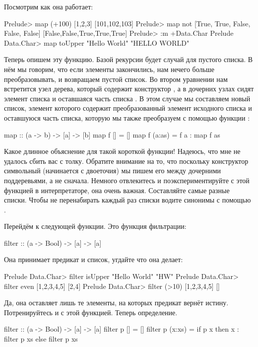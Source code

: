 Посмотрим как она работает:

\begin{code}
Prelude> map (+100) [1,2,3]
[101,102,103]
Prelude> map not [True, True, False, False, False]
[False,False,True,True,True]
Prelude> :m +Data.Char
Prelude Data.Char> map toUpper "Hello World"
"HELLO WORLD"
\end{code}

Теперь опишем эту функцию.
Базой рекурсии будет случай для пустого списка.
В нём мы говорим, что если элементы закончились, нам нечего
больше преобразовывать, и возвращаем пустой список. 
Во втором уравнении нам встретится узел дерева,
который содержит конструктор \In{:}, а в дочерних узлах
сидят элемент списка  и оставшаяся часть списка . 
 В этом случае 
мы составляем новый список, элемент которого содержит
преобразованный элемент  исходного списка
и оставшуюся часть списка, которую мы также
преобразуем с помощью функции :

\begin{code}
map :: (a -> b) -> [a] -> [b]
map f []     = []
map f (a:as) = f a : map f as
\end{code}

Какое длинное объяснение для такой короткой функции! Надеюсь, что
мне не удалось сбить вас с толку. Обратите внимание на то, 
что поскольку конструктор символьный (начинается с двоеточия) 
мы пишем его между дочерними поддеревьями, а не сначала.
Немного отвлекитесь
и поэкспериментируйте с этой функцией в интерпретаторе,
она очень важная. Составляйте самые разные списки.
Чтобы не перенабирать каждый раз списки водите
синонимы с помощью .

Перейдём к следующей функции. Это функция фильтрации:

\begin{code}
filter :: (a -> Bool) -> [a] -> [a]
\end{code}

Она принимает предикат и список, угдайте что она делает:

\begin{code}
Prelude Data.Char> filter isUpper "Hello World"
"HW"
Prelude Data.Char> filter even [1,2,3,4,5]
[2,4]
Prelude Data.Char> filter (>10) [1,2,3,4,5]
[]
\end{code}

Да, она оставляет лишь те элементы, на которых
предикат вернёт истину. Потренируйтесь и с этой функцией.
Теперь определение.

\begin{code}
filter :: (a -> Bool) -> [a] -> [a]
filter p []     = []
filter p (x:xs) = if p x then x : filter p xs else filter p xs
\end{code}

